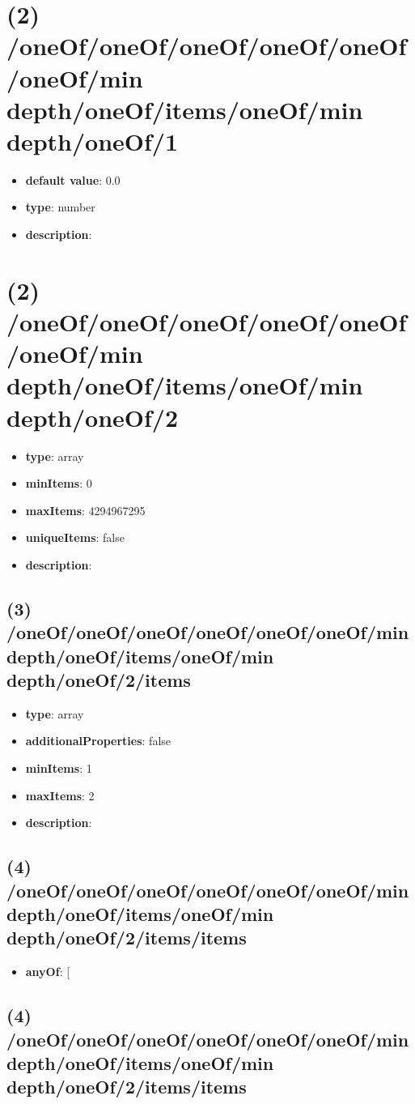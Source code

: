 \section{(2) /oneOf/oneOf/oneOf/oneOf/oneOf/oneOf/min depth/oneOf/items/oneOf/min depth/oneOf/1}
\begin{itemize}[leftmargin=2em]\item {\bf default value}: 0.0
\item {\bf type}: number
\item {\bf description}: 
\end{itemize}\section{(2) /oneOf/oneOf/oneOf/oneOf/oneOf/oneOf/min depth/oneOf/items/oneOf/min depth/oneOf/2}
\begin{itemize}[leftmargin=2em]\item {\bf type}: array
\item {\bf minItems}: 0
\item {\bf maxItems}: 4294967295
\item {\bf uniqueItems}: false
\item {\bf description}: 
\end{itemize}\subsection{(3) /oneOf/oneOf/oneOf/oneOf/oneOf/oneOf/min depth/oneOf/items/oneOf/min depth/oneOf/2/items}
\begin{itemize}[leftmargin=3em]\item {\bf type}: array
\item {\bf additionalProperties}: false
\item {\bf minItems}: 1
\item {\bf maxItems}: 2
\item {\bf description}: 
\end{itemize}\subsection{(4) /oneOf/oneOf/oneOf/oneOf/oneOf/oneOf/min depth/oneOf/items/oneOf/min depth/oneOf/2/items/items}
\begin{itemize}[leftmargin=4em]\item {\bf anyOf}: [\end{itemize}\subsection{(4) /oneOf/oneOf/oneOf/oneOf/oneOf/oneOf/min depth/oneOf/items/oneOf/min depth/oneOf/2/items/items}
